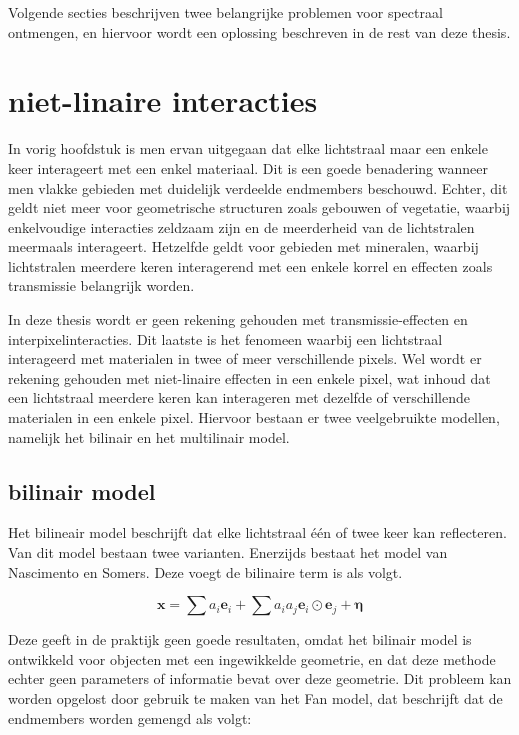 \documentclass[12pt]{report}
\begin{document}
\vspace{5 mm}

Volgende secties beschrijven twee belangrijke problemen voor spectraal ontmengen, en hiervoor wordt een oplossing beschreven in de rest van deze thesis.


\section{niet-linaire interacties}

In vorig hoofdstuk is men ervan uitgegaan dat elke lichtstraal maar een enkele keer interageert met een enkel materiaal. Dit is een goede benadering wanneer men vlakke gebieden met duidelijk verdeelde endmembers beschouwd. Echter, dit geldt niet meer voor geometrische structuren zoals gebouwen of vegetatie, waarbij enkelvoudige interacties zeldzaam zijn en de meerderheid van de lichtstralen meermaals interageert. Hetzelfde geldt voor gebieden met mineralen, waarbij lichtstralen meerdere keren interagerend met een enkele korrel en effecten zoals transmissie belangrijk worden.

In deze thesis wordt er geen rekening gehouden met transmissie-effecten en interpixelinteracties. Dit laatste is het fenomeen waarbij een lichtstraal interageerd met materialen in twee of meer verschillende pixels. Wel wordt er rekening gehouden met niet-linaire effecten in een enkele pixel, wat inhoud dat een lichtstraal meerdere keren kan interageren met dezelfde of verschillende materialen in een enkele pixel. Hiervoor bestaan er twee veelgebruikte modellen, namelijk het bilinair en het multilinair model.

\subsection{bilinair model}

Het bilineair model beschrijft dat elke lichtstraal \'e\'en of twee keer kan reflecteren. Van dit model bestaan twee varianten. Enerzijds bestaat het model van Nascimento en Somers\cite{mlinmix}. Deze voegt de bilinaire term is als volgt.

\begin{equation}
\bm{x} = \sum a_i \bm{e}_i + \sum a_i a_j \bm{e}_i \odot \bm{e}_j + \bm{\eta}
\end{equation}

Deze geeft in de praktijk geen goede resultaten, omdat het bilinair model is ontwikkeld voor objecten met een ingewikkelde geometrie, en dat deze methode echter geen parameters of informatie bevat over deze geometrie. Dit probleem kan worden opgelost door gebruik te maken van het Fan model\cite{mlinmix}, dat beschrijft dat de endmembers worden gemengd als volgt:
\end{document}
